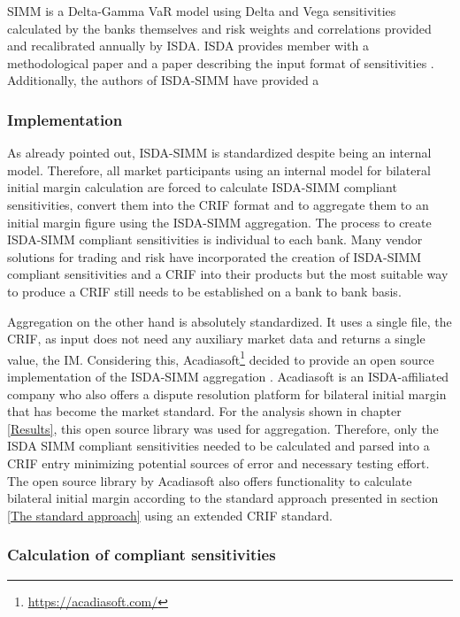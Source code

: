 \documentclass[../Thesis_AHoecherl.tex]{subfiles}
\begin{document}
    SIMM is a Delta-Gamma VaR model using Delta and Vega sensitivities calculated by the banks themselves and risk weights and correlations provided and recalibrated annually by ISDA. ISDA provides member with a methodological paper \cite{SIMM} and a paper describing the input format of sensitivities \cite{RiskDataStandard}. Additionally, the authors of ISDA-SIMM have provided a 

    \subsubsection{Implementation}\label{sec:ISDA SIMM implementation}
    As already pointed out, ISDA-SIMM is standardized despite being an internal model. Therefore, all market participants using an internal model for bilateral initial margin calculation are forced to calculate ISDA-SIMM compliant sensitivities, convert them into the CRIF format and to aggregate them to an initial margin figure using the ISDA-SIMM aggregation.
    The process to create ISDA-SIMM compliant sensitivities is individual to each bank. Many vendor solutions for trading and risk have incorporated the creation of ISDA-SIMM compliant sensitivities and a CRIF into their products but the most suitable way to produce a CRIF still needs to be established on a bank to bank basis.
    
    Aggregation on the other hand is absolutely standardized. It uses a single file, the \gls{CRIF}, as input does not need any auxiliary market data and returns a single value, the IM. 
    Considering this, Acadiasoft\footnote{\url{https://acadiasoft.com/}} decided to provide an open source implementation of the ISDA-SIMM aggregation \cite{simm-lib}. Acadiasoft is an ISDA-affiliated company who also offers a dispute resolution platform for bilateral initial margin that has become the market standard.
    For the analysis shown in chapter \ref{Results}, this open source library was used for aggregation. 
    Therefore, only the ISDA SIMM compliant sensitivities needed to be calculated and parsed into a CRIF entry minimizing potential sources of error and necessary testing effort. The open source library by Acadiasoft also offers functionality to calculate bilateral initial margin according to the standard approach presented in section \ref{The standard approach} using an extended \gls{CRIF} standard.

    \subsubsection{Calculation of compliant sensitivities}\label{Calculation of ISDA SIMM compliant sensitivities}
\end{document}
